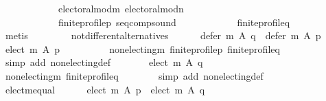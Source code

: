 \begin{isabellebody}
\ \ \ \ \ \ \ \ \ \ \ \ electoral{\isacharunderscore}{\kern0pt}mod{\isacharunderscore}{\kern0pt}m\ electoral{\isacharunderscore}{\kern0pt}mod{\isacharunderscore}{\kern0pt}n\isanewline
\ \ \ \ \ \ \ \ \ \ \ \ finite{\isacharunderscore}{\kern0pt}profile{\isacharunderscore}{\kern0pt}p\ seq{\isacharunderscore}{\kern0pt}comp{\isacharunderscore}{\kern0pt}sound\isanewline
\ \ \ \ \ \ \ \ \ \ \ \ finite{\isacharunderscore}{\kern0pt}profile{\isacharunderscore}{\kern0pt}q\isanewline
\ \ \ \ \ \ \isamarkupfalse%
\ metis\isanewline
\ \ \isamarkupfalse%
\isanewline
\ \ \ \ \isamarkupfalse%
\ not{\isacharunderscore}{\kern0pt}different{\isacharunderscore}{\kern0pt}alternatives{\isacharcolon}{\kern0pt}\isanewline
\ \ \ \ \ \ {\isachardoublequoteopen}{\isasymnot}{\isacharparenleft}{\kern0pt}defer\ m\ A\ q\ {\isasymnoteq}\ defer\ m\ A\ p{\isacharparenright}{\kern0pt}{\isachardoublequoteclose}\isanewline
\ \ \ \ \isamarkupfalse%
\ {\isachardoublequoteopen}elect\ m\ A\ p\ {\isacharequal}{\kern0pt}\ {\isacharbraceleft}{\kern0pt}{\isacharbraceright}{\kern0pt}{\isachardoublequoteclose}\isanewline
\ \ \ \ \ \ \isamarkupfalse%
\ non{\isacharunderscore}{\kern0pt}electing{\isacharunderscore}{\kern0pt}m\ finite{\isacharunderscore}{\kern0pt}profile{\isacharunderscore}{\kern0pt}p\ finite{\isacharunderscore}{\kern0pt}profile{\isacharunderscore}{\kern0pt}q\isanewline
\ \ \ \ \ \ \isamarkupfalse%
\ {\isacharparenleft}{\kern0pt}simp\ add{\isacharcolon}{\kern0pt}\ non{\isacharunderscore}{\kern0pt}electing{\isacharunderscore}{\kern0pt}def{\isacharparenright}{\kern0pt}\isanewline
\ \ \ \ \isamarkupfalse%
\ \isamarkupfalse%
\ {\isachardoublequoteopen}elect\ m\ A\ q\ {\isacharequal}{\kern0pt}\ {\isacharbraceleft}{\kern0pt}{\isacharbraceright}{\kern0pt}{\isachardoublequoteclose}\isanewline
\ \ \ \ \ \ \isamarkupfalse%
\ non{\isacharunderscore}{\kern0pt}electing{\isacharunderscore}{\kern0pt}m\ finite{\isacharunderscore}{\kern0pt}profile{\isacharunderscore}{\kern0pt}q\isanewline
\ \ \ \ \ \ \isamarkupfalse%
\ {\isacharparenleft}{\kern0pt}simp\ add{\isacharcolon}{\kern0pt}\ non{\isacharunderscore}{\kern0pt}electing{\isacharunderscore}{\kern0pt}def{\isacharparenright}{\kern0pt}\isanewline
\ \ \ \ \isamarkupfalse%
\ \isamarkupfalse%
\ elect{\isacharunderscore}{\kern0pt}m{\isacharunderscore}{\kern0pt}equal{\isacharcolon}{\kern0pt}\isanewline
\ \ \ \ \ \ {\isachardoublequoteopen}elect\ m\ A\ p\ {\isacharequal}{\kern0pt}\ elect\ m\ A\ q{\isachardoublequoteclose}\isanewline

\end{isabellebody}

